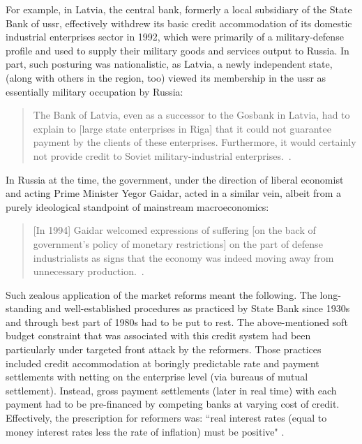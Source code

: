 For example, in Latvia, the central bank, formerly a local subsidiary of the State Bank of \ac{ussr}, effectively withdrew its basic credit accommodation of its domestic industrial enterprises sector in 1992, which were primarily of a military-defense profile and used to supply their military goods and services output to Russia. In part, such posturing was nationalistic, as Latvia, a newly independent state, (along with others in the region, too) viewed its membership in the \ac{ussr} as essentially military occupation by Russia:

\begin{quote}
The Bank of Latvia, even as a successor to the Gosbank in Latvia, had to explain to [large state enterprises in Riga] that it could not guarantee payment by the clients of these enterprises. Furthermore, it would certainly not provide credit to Soviet military-industrial enterprises.~\citep[p.~30]{viksnins1997}.
\end{quote}

In Russia at the time, the government, under the direction of liberal economist and acting Prime Minister Yegor Gaidar, acted in a similar vein, albeit from a purely ideological standpoint of mainstream macroeconomics:

\begin{quote}
[In 1994] Gaidar welcomed expressions of suffering [on the back of government's policy of monetary restrictions] on the part of defense industrialists as signs that the economy was indeed moving away from unnecessary production.~\citep[p.~94]{woodruff1999}.
\end{quote}

Such zealous application of the market reforms meant the following. The long-standing and well-established procedures as practiced by State Bank since 1930s and through best part of 1980s had to be put to rest. The above-mentioned soft budget constraint that was associated with this credit system had been particularly under targeted front attack by the reformers. Those practices included credit accommodation at boringly predictable rate and payment settlements with netting on the enterprise level (via bureaus of mutual settlement). Instead, gross payment settlements (later in real time) with each payment had to be pre-financed by competing banks at varying cost of credit. Effectively, the prescription for reformers was: ``real interest rates (equal to money interest rates less the rate of inflation) must be positive" \citep[p.~108]{peck1991}.

